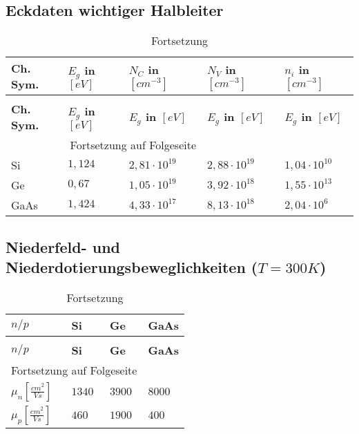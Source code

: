 \documentclass[12pt,a4paper]{report}%
\numberwithin{equation}{section}
\def\bracks#1{\left[ #1 \right]}
\begin{document}
	\subsection{Eckdaten wichtiger Halbleiter} \label{ch:eckd}
	\renewcommand{\arraystretch}{1.5}
	\begin{longtable} {|p{2cm}|p{2.6cm}|p{2.6cm}|p{2.6cm}|p{2.7cm}|} \hline
	\textbf{Ch. Sym.} & \textbf{$E_g$ in $\bracks{eV}$} & \textbf{$N_C$ in $\bracks{cm^{-3}}$} & \textbf{$N_V$ in $\bracks{cm^{-3}}$} & \textbf{$n_i$ in $\bracks{cm^{-3}}$} \\
	\hline
	\endfirsthead %
	\caption{Fortsetzung}\\ \hline
	\textbf{Ch. Sym.} & \textbf{$E_g$ in $\bracks{eV}$} & \textbf{$E_g$ in $\bracks{eV}$} & \textbf{$E_g$ in $\bracks{eV}$} & \textbf{$E_g$ in $\bracks{eV}$} \\
	\hline
	\endhead %
	\multicolumn{3}{r}{Fortsetzung auf Folgeseite}\\
	\endfoot
	\hline
	\endlastfoot
	Si & $1,124$ & $2,81 \cdot 10^{19}$ & $2,88 \cdot 10^{19}$ & $1,04 \cdot 10^{10}$ \\ \hline
	Ge & $0,67$ & $1,05 \cdot 10^{19}$ & $3,92 \cdot 10^{18}$ & $1,55 \cdot 10^{13}$ \\ \hline
	GaAs & $1,424$ & $4,33 \cdot 10^{17}$ & $8,13 \cdot 10^{18}$ & $2,04 \cdot 10^{6}$ \\ \hline
	\end{longtable}
	\renewcommand{\arraystretch}{1}
	
\subsection{Niederfeld- und Niederdotierungsbeweglichkeiten ($T = 300K$)} \label{ch:bewegl.}
	\renewcommand{\arraystretch}{1.5}
	\begin{longtable} {|p{2.4cm}|p{3.5cm}|p{3.5cm}|p{3.5cm}|} \hline
	\textbf{$n/p$} & \textbf{Si} & \textbf{Ge} & \textbf{GaAs} \\
	\hline
	\endfirsthead %
	\caption{Fortsetzung}\\ \hline
	\textbf{$n/p$} & \textbf{Si} & \textbf{Ge} & \textbf{GaAs} \\
	\hline
	\endhead %
	\multicolumn{3}{r}{Fortsetzung auf Folgeseite}\\
	\endfoot
	\hline
	\endlastfoot
	  $\mu_n \bracks{\frac{cm^2}{Vs}}$ & $1340$ & $3900$ & $8000$ \\ \hline	
	  $\mu_p \bracks{\frac{cm^2}{Vs}}$ & $460$ & $1900$ & $400$ \\ \hline	
	\end{longtable}
	\renewcommand{\arraystretch}{1}	
	
\end{document}
